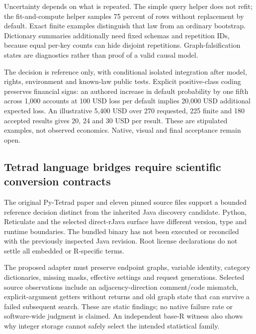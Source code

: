 Uncertainty depends on what is repeated. The simple query helper does
not refit; the fit-and-compute helper samples 75 percent of rows without
replacement by default. Exact finite examples distinguish that law from
an ordinary bootstrap. Dictionary summaries additionally need fixed
schemas and repetition IDs, because equal per-key counts can hide
disjoint repetitions. Graph-falsification states are diagnostics rather
than proof of a valid causal
model.\citep{exec24_gcm_source,exec24_gcm_choice}

The decision is reference only, with conditional isolated integration
after model, rights, environment and known-law public tests. Explicit
positive-class coding preserves financial signs: an authored increase in
default probability by one fifth across 1,000 accounts at 100 USD loss
per default implies 20,000 USD additional expected loss. An illustrative
5,400 USD over 270 requested, 225 finite and 180 accepted results gives
20, 24 and 30 USD per result. These are stipulated examples, not
observed economics. Native, visual and final acceptance remain
open.\citep{exec24_gcm_choice}

\hypertarget{tetrad-language-bridges-require-scientific-conversion-contracts}{%
\subsection{Tetrad language bridges require scientific conversion
contracts}\label{tetrad-language-bridges-require-scientific-conversion-contracts}}

The original Py-Tetrad paper and eleven pinned source files support a
bounded reference decision distinct from the inherited Java discovery
candidate. Python, Reticulate and the selected direct-rJava surface have
different version, type and runtime boundaries. The bundled binary has
not been executed or reconciled with the previously inspected Java
revision. Root license declarations do not settle all embedded or
R-specific terms.\citep{exec24_pytetrad_paper,exec24_pytetrad_source}

The proposed adapter must preserve endpoint graphs, variable identity,
category dictionaries, missing masks, effective settings and request
generations. Selected source observations include an adjacency-direction
comment/code mismatch, explicit-argument getters without returns and old
graph state that can survive a failed subsequent search. These are
static findings; no native failure rate or software-wide judgment is
claimed. An independent base-R witness also shows why integer storage
cannot safely select the intended statistical
family.\citep{exec24_pytetrad_source,exec24_pytetrad_choice}

